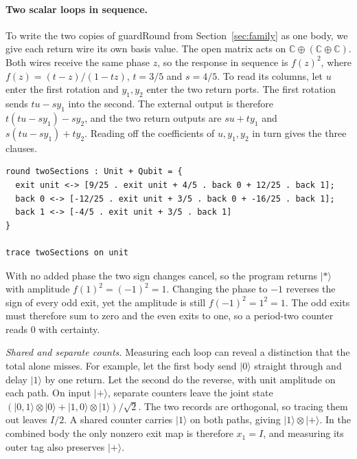 \documentclass[acmsmall,screen,review,anonymous,nonacm]{acmart}
\newcommand{\storyinlineface}{\small\ttfamily}
\newcommand{\code}[1]{\textnormal{\storyinlineface #1}}
\newcommand{\ket}[1]{\lvert #1\rangle}
\numberwithin{equation}{section}
\begin{document}
\paragraph{Two scalar loops in sequence.}
To write the two copies of \code{guardRound} from
Section~\ref{sec:family} as one body, we give each return wire its
own basis value. The open matrix acts on $\mathbb C\oplus(\mathbb C\oplus\mathbb C)$. Both wires receive
the same phase $z$, so the response in sequence is $f(z)^2$, where
$f(z)=(t-z)/(1-tz)$, $t=3/5$ and $s=4/5$. To read its columns, let $u$ enter
the first rotation and $y_1,y_2$ enter the two return ports. The first
rotation sends $tu-sy_1$ into the second. The external output is therefore
$t(tu-sy_1)-sy_2$, and the two return outputs are $su+ty_1$ and
$s(tu-sy_1)+ty_2$. Reading off the coefficients of $u,y_1,y_2$ in turn
gives the three clauses.
\par\noindent\begin{minipage}{\linewidth}
\begin{lstlisting}
round twoSections : Unit + Qubit = {
  exit unit <-> [9/25 . exit unit + 4/5 . back 0 + 12/25 . back 1];
  back 0 <-> [-12/25 . exit unit + 3/5 . back 0 + -16/25 . back 1];
  back 1 <-> [-4/5 . exit unit + 3/5 . back 1]
}

trace twoSections on unit
\end{lstlisting}
\end{minipage}\par
With no added phase the two sign changes cancel, so the program returns
$\ket*$ with amplitude $f(1)^2=(-1)^2=1$. Changing the phase to $-1$
reverses the sign of every odd exit, yet the amplitude is still
$f(-1)^2=1^2=1$. The odd exits must therefore sum to zero and the even exits
to one, so a period-two counter reads $0$ with certainty.

\textit{Shared and separate counts.} Measuring each loop can reveal a distinction that the total alone misses.
For example, let the first body send $\ket0$ straight through and delay $\ket1$ by
one return. Let the second do the reverse, with unit amplitude on each path. On input
$\ket+$, separate counters leave the joint state
$(\ket{0,1}\otimes\ket0+\ket{1,0}\otimes\ket1)/\sqrt2$.
The two records are orthogonal, so tracing them out leaves $I/2$.
A shared counter carries $\ket1$ on both paths, giving
$\ket1\otimes\ket+$. In the combined body the only nonzero exit map is
therefore $x_1=I$, and measuring its outer tag also preserves $\ket+$.
\end{document}
